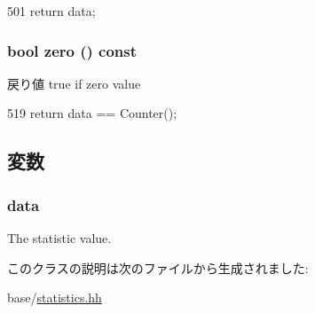\begin{DoxyCode}
501 { return data; }
\end{DoxyCode}
\hypertarget{classStats_1_1StatStor_a4e72b01b727d3165e75cba84eb507491}{
\subsubsection[{zero}]{\setlength{\rightskip}{0pt plus 5cm}bool zero () const}}
\label{classStats_1_1StatStor_a4e72b01b727d3165e75cba84eb507491}
\begin{DoxyReturn}{戻り値}
true if zero value 
\end{DoxyReturn}



\begin{DoxyCode}
519 { return data == Counter(); }
\end{DoxyCode}


\subsection{変数}
\hypertarget{classStats_1_1StatStor_a81eb27126d778c8c1b33a0e64488b4cf}{
\subsubsection[{data}]{ {\bf data}}}
\label{classStats_1_1StatStor_a81eb27126d778c8c1b33a0e64488b4cf}
The statistic value. 

このクラスの説明は次のファイルから生成されました:\begin{DoxyCompactItemize}
\item 
base/\hyperlink{statistics_8hh}{statistics.hh}\end{DoxyCompactItemize}
